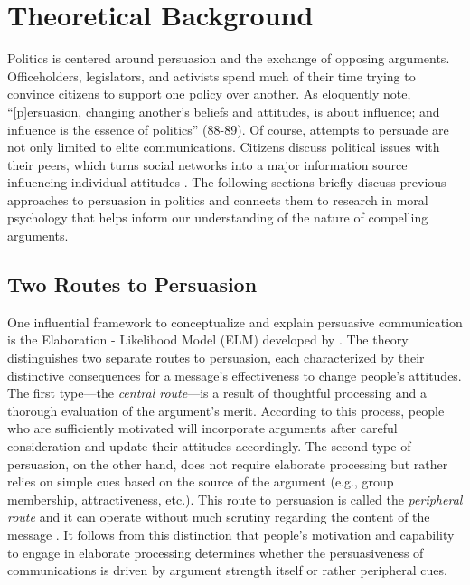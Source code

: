 \section{Theoretical Background}

Politics is centered around persuasion and the exchange of opposing arguments. Officeholders, legislators, and activists spend much of their time trying to convince citizens to support one policy over another. As \citet{cobb1997changing} eloquently note, ``[p]ersuasion, changing another's beliefs and attitudes, is about influence; and influence is the essence of politics'' (88-89). Of course, attempts to persuade are not only limited to elite communications. Citizens discuss political issues with their peers, which turns social networks into a major information source influencing individual attitudes \citep[e.g.,][]{huckfeldt1995political,ahn2010communication,lazer2010coevolution}. The following sections briefly discuss previous approaches to persuasion in politics and connects them to research in moral psychology that helps inform our understanding of the nature of compelling arguments.



\subsection{Two Routes to Persuasion}

One influential framework to conceptualize and explain persuasive communication is the Elaboration - Likelihood Model (ELM) developed by \citet{petty1986communication,petty1986elaboration}. The theory distinguishes two separate routes to persuasion, each characterized by their distinctive consequences for a message's effectiveness to change people's attitudes. The first type---the \textit{central route}---is a result of thoughtful processing and a thorough evaluation of the argument's merit. According to this process, people who are sufficiently motivated will incorporate arguments after careful consideration and update their attitudes accordingly. The second type of persuasion, on the other hand, does not require elaborate processing but rather relies on simple cues based on the source of the argument (e.g., group membership, attractiveness, etc.). This route to persuasion is called the \textit{peripheral route} and it can operate without much scrutiny regarding the content of the message \citep[see also][for a similar distinction between systematic and heuristic processing]{chaiken1989heuristic}. It follows from this distinction that people's motivation and capability to engage in elaborate processing determines whether the persuasiveness of communications is driven by argument strength itself or rather peripheral cues.

